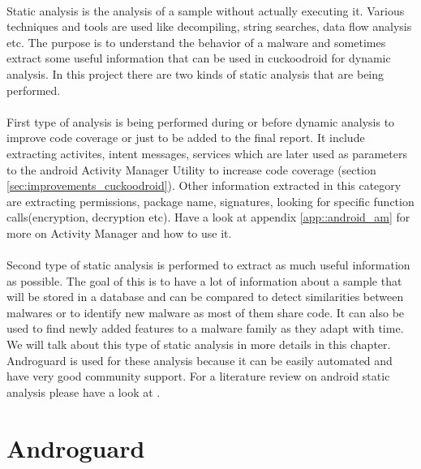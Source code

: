 \documentclass[../main.tex]{subfile}
\begin{document}
	
		\paragraph{} Static analysis is the analysis of a sample without actually executing it. Various techniques and tools are used like decompiling, string searches, data flow analysis etc. The purpose is to understand the behavior of a malware and sometimes extract some useful information that can be used in cuckoodroid for dynamic analysis. In this project there are two kinds of static analysis that are being performed.
		\paragraph{} First type of analysis is being performed during or before dynamic analysis to improve code coverage or just to be added to the final report. It include extracting activites, intent messages, services which are later used as parameters to the android Activity Manager Utility to increase code coverage (section \ref{sec:improvements_cuckoodroid}). Other information extracted in this category are extracting permissions, package name, signatures, looking for specific function calls(encryption, decryption etc). Have a look at appendix \ref{app::android_am} for more on Activity Manager and how to use it. %
		
		\paragraph{} Second type of static analysis is performed to extract as much useful information as possible. The goal of this is to have a lot of information about a sample that will be stored in a database and can be compared to detect similarities between malwares or to identify new malware as most of them share code. It can also be used to find newly added features to a malware family as they adapt with time. We will talk about this type of static analysis in more details in this chapter. Androguard is used for these analysis because it can be easily automated and have very good community support. For a literature review on android static analysis please have a look at \cite{android_static_literature}.
		
		\section{Androguard}\label{sec:androguard}
\end{document}
